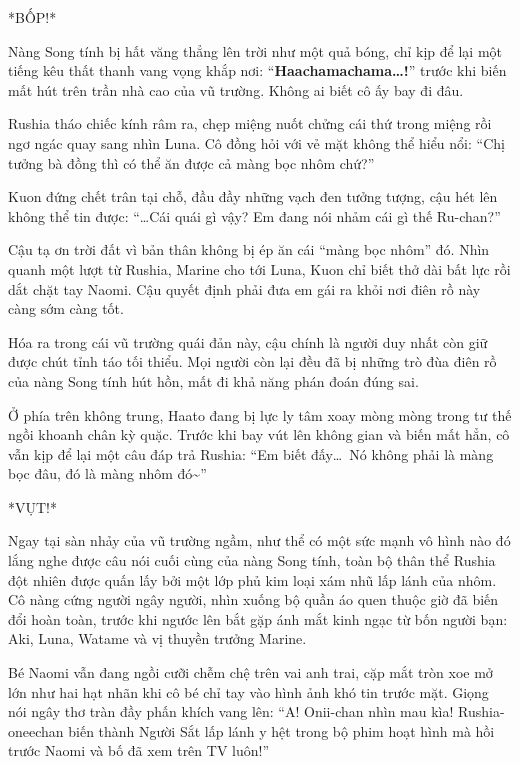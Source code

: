 \documentclass[../main.tex]{subfiles}
\begin{document}
*BỐP!*

Nàng Song tính bị hất văng thẳng lên trời như một quả bóng, chỉ kịp để lại một tiếng kêu thất thanh vang vọng khắp nơi: ``\textbf{Haachamachama\dots!}'' trước khi biến mất hút trên trần nhà cao của vũ trường. Không ai biết cô ấy bay đi đâu.

Rushia tháo chiếc kính râm ra, chẹp miệng nuốt chửng cái thứ trong miệng rồi ngơ ngác quay sang nhìn Luna. Cô đồng hỏi với vẻ mặt không thể hiểu nổi: ``Chị tưởng bà đồng thì có thể ăn được cả màng bọc nhôm chứ?''

Kuon đứng chết trân tại chỗ, đầu đầy những vạch đen tưởng tượng, cậu hét lên không thể tin được: ``\dots Cái quái gì vậy? Em đang nói nhảm cái gì thế Ru-chan?''

Cậu tạ ơn trời đất vì bản thân không bị ép ăn cái ``màng bọc nhôm'' đó. Nhìn quanh một lượt từ Rushia, Marine cho tới Luna, Kuon chỉ biết thở dài bất lực rồi dắt chặt tay Naomi. Cậu quyết định phải đưa em gái ra khỏi nơi điên rồ này càng sớm càng tốt.

Hóa ra trong cái vũ trường quái đản này, cậu chính là người duy nhất còn giữ được chút tỉnh táo tối thiểu. Mọi người còn lại đều đã bị những trò đùa điên rồ của nàng Song tính hút hồn, mất đi khả năng phán đoán đúng sai.

\ct

Ở phía trên không trung, Haato đang bị lực ly tâm xoay mòng mòng trong tư thế ngồi khoanh chân kỳ quặc. Trước khi bay vút lên không gian và biến mất hẳn, cô vẫn kịp để lại một câu đáp trả Rushia: ``Em biết đấy\dots\ Nó không phải là màng bọc đâu, đó là màng nhôm đó\~{}''


*VỤT!*

Ngay tại sàn nhảy của vũ trường ngầm, như thể có một sức mạnh vô hình nào đó lắng nghe được câu nói cuối cùng của nàng Song tính, toàn bộ thân thể Rushia đột nhiên được quấn lấy bởi một lớp phủ kim loại xám nhũ lấp lánh của nhôm. Cô nàng cứng người ngây người, nhìn xuống bộ quần áo quen thuộc giờ đã biến đổi hoàn toàn, trước khi ngước lên bắt gặp ánh mắt kinh ngạc từ bốn người bạn: Aki, Luna, Watame và vị thuyền trưởng Marine.

Bé Naomi vẫn đang ngồi cưỡi chễm chệ trên vai anh trai, cặp mắt tròn xoe mở lớn như hai hạt nhãn khi cô bé chỉ tay vào hình ảnh khó tin trước mặt. Giọng nói ngây thơ tràn đầy phấn khích vang lên: ``A! Onii-chan nhìn mau kìa! Rushia-oneechan biến thành Người Sắt lấp lánh y hệt trong bộ phim hoạt hình mà hồi trước Naomi và bố đã xem trên TV luôn!''
\end{document}
